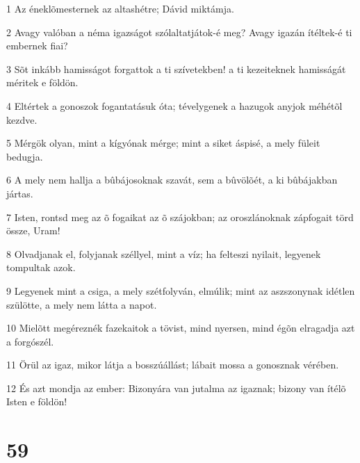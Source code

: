 \par 1 Az éneklõmesternek az altashétre; Dávid miktámja.
\par 2 Avagy valóban a néma igazságot szólaltatjátok-é meg? Avagy igazán ítéltek-é ti embernek fiai?
\par 3 Sõt inkább hamisságot forgattok a ti szívetekben! a ti kezeiteknek hamisságát méritek e földön.
\par 4 Eltértek a gonoszok fogantatásuk óta; tévelygenek a hazugok anyjok méhétõl kezdve.
\par 5 Mérgök olyan, mint a kígyónak mérge; mint a siket áspisé, a mely füleit bedugja.
\par 6 A mely nem hallja a bûbájosoknak szavát, sem a bûvölõét, a ki bûbájakban jártas.
\par 7 Isten, rontsd meg az õ fogaikat az õ szájokban; az oroszlánoknak zápfogait törd össze, Uram!
\par 8 Olvadjanak el, folyjanak széllyel, mint a víz; ha felteszi nyilait, legyenek tompultak azok.
\par 9 Legyenek mint a csiga, a mely szétfolyván, elmúlik; mint az aszszonynak idétlen szülötte, a mely nem látta a napot.
\par 10 Mielõtt megéreznék fazekaitok a tövist, mind nyersen, mind égõn elragadja azt a forgószél.
\par 11 Örül az igaz, mikor látja a bosszúállást; lábait mossa a gonosznak vérében.
\par 12 És azt mondja az ember: Bizonyára van jutalma az igaznak; bizony van ítélõ Isten e földön!

\chapter{59}

